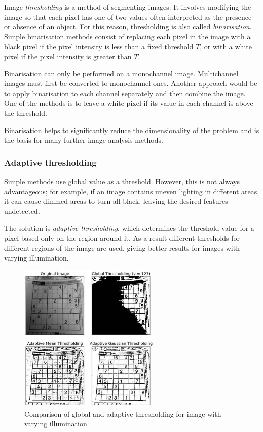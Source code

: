 Image \emph{thresholding} is a method of segmenting images. It involves modifying the image so that each pixel has one of two values often interpreted as the presence or absence of an object. For this reason, thresholding is also called \emph{binarisation}. Simple binarisation methods consist of replacing each pixel in the image with a black pixel if the pixel intensity is less than a fixed threshold $T$, or with a white pixel if the pixel intensity is greater than $T$.\cite{morphology_book} 

Binarisation can only be performed on a monochannel image. Multichannel images must first be converted to monochannel ones. Another approach would be to apply binarisation to each channel separately and then combine the image. One of the methods is to leave a white pixel if its value in each channel is above the threshold.

Binarisation helps to significantly reduce the dimensionality of the problem and is the basis for many further image analysis methods. 

\subsubsection{Adaptive thresholding}

Simple methods use global value as a threshold. However, this is not always advantageous; for example, if an image contains uneven lighting in different areas, it can cause dimmed areas to turn all black, leaving the desired features undetected. 

The solution is \emph{adaptive thresholding}, which determines the threshold value for a pixel based only on the region around it. As a result different thresholds for different regions of the image are used, giving better results for images with varying illumination. 

\begin{figure}[H]
    \centering
    \includegraphics[width=0.6\textwidth]{Content/Images/adaptive_threshold.jpg}
    \caption{Comparison of global and adaptive thresholding for image with varying illumination \cite{adaptive_thresholding}}
\end{figure}

